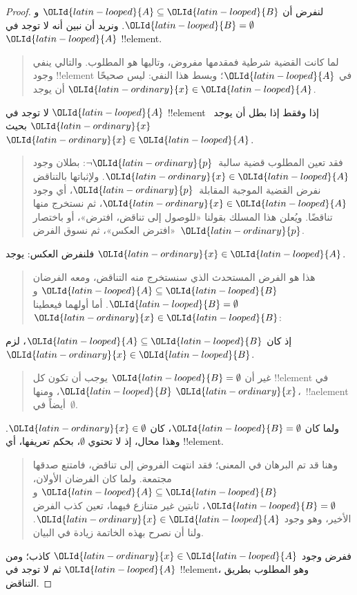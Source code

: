 \documentclass[../../../include/open-logic-section]{subfiles}
\begin{document}
\begin{proof}
  لنفرض أن $\OLId{latin-looped}{A} \subseteq \OLId{latin-looped}{B}$ و$\OLId{latin-looped}{B} = \emptyset$. ونريد أن نبين أنه لا توجد
  في $\OLId{latin-looped}{A}$ !!{element}.
  \begin{quote}
    لما كانت القضية شرطية فمقدمها مفروض، وتاليها هو المطلوب. والتالي
    ينفي وجود !!{element} في $\OLId{latin-looped}{A}$؛ وبسط هذا النفي: ليس صحيحًا أن يوجد
    $\OLId{latin-ordinary}{x} \in \OLId{latin-looped}{A}$.
  \end{quote}
  لا توجد في $\OLId{latin-looped}{A}$ !!{element} إذا وفقط إذا بطل أن يوجد~$\OLId{latin-ordinary}{x}$
  بحيث $\OLId{latin-ordinary}{x} \in \OLId{latin-looped}{A}$.
  \begin{quote}
    فقد تعين المطلوب قضية سالبة~$\lnot \OLId{latin-ordinary}{p}$: بطلان وجود $\OLId{latin-ordinary}{x} \in \OLId{latin-looped}{A}$.
    ولإثباتها بالتناقض نفرض القضية الموجبة المقابلة~$\OLId{latin-ordinary}{p}$، أي وجود
    $\OLId{latin-ordinary}{x} \in \OLId{latin-looped}{A}$، ثم نستخرج منها تناقضًا. ويُعلن هذا المسلك بقولنا
    «للوصول إلى تناقض، افترض»، أو باختصار «افترض العكس»، ثم نسوق
    الفرض~$\OLId{latin-ordinary}{p}$.
  \end{quote}
  فلنفرض العكس: يوجد $\OLId{latin-ordinary}{x} \in \OLId{latin-looped}{A}$.
  \begin{quote}
    هذا هو الفرض المستحدث الذي سنستخرج منه التناقض، ومعه الفرضان
    $\OLId{latin-looped}{A} \subseteq \OLId{latin-looped}{B}$ و$\OLId{latin-looped}{B} = \emptyset$. أما أولهما فيعطينا
    $\OLId{latin-ordinary}{x} \in \OLId{latin-looped}{B}$:
  \end{quote}
  إذ كان $\OLId{latin-looped}{A} \subseteq \OLId{latin-looped}{B}$، لزم $\OLId{latin-ordinary}{x} \in \OLId{latin-looped}{B}$.
  \begin{quote}
    غير أن $\OLId{latin-looped}{B} = \emptyset$ يوجب أن تكون كل !!{element} في $\OLId{latin-looped}{B}$، ومنها
    $\OLId{latin-ordinary}{x}$،~!!a{element} أيضاً في~$\emptyset$.
  \end{quote}
  ولما كان $\OLId{latin-looped}{B} = \emptyset$، كان $\OLId{latin-ordinary}{x} \in \emptyset$. وهذا محال، إذ لا
  تحتوي $\emptyset$، بحكم تعريفها، أي !!{element}.
  \begin{quote}
    وهنا قد تم البرهان في المعنى؛ فقد انتهت الفروض إلى تناقض، فامتنع
    صدقها مجتمعة. ولما كان الفرضان الأولان، $\OLId{latin-looped}{A} \subseteq \OLId{latin-looped}{B}$ و
    $\OLId{latin-looped}{B} = \emptyset$، ثابتين غير متنازع فيهما، تعين كذب الفرض الأخير،
    وهو وجود $\OLId{latin-ordinary}{x} \in \OLId{latin-looped}{A}$. ولنا أن نصرح بهذه الخاتمة زيادة في البيان.
  \end{quote}
  ففرض وجود $\OLId{latin-ordinary}{x} \in \OLId{latin-looped}{A}$ كاذب؛ ومن ثم لا توجد في $\OLId{latin-looped}{A}$ !!{element}، وهو
  المطلوب بطريق التناقض.
\end{proof}
\end{document}
